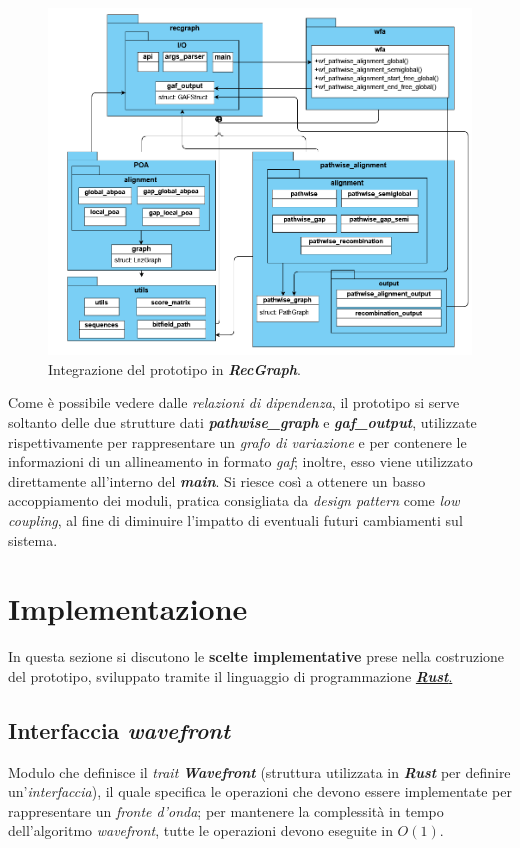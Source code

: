     \begin{figure}[H]
        \centering
        \includegraphics[width=1\linewidth]{images/wf_integration.png} 
        \caption[Integrazione]{Integrazione del prototipo in \textbf{\textit{RecGraph}}.}
        \label{fig:wf_integration}
    \end{figure}
    \vspace{20pt}
    \noindent
    Come è possibile vedere dalle \emph{relazioni di dipendenza}, il prototipo si serve soltanto delle due strutture dati \textbf{\textit{pathwise\_graph}} e \textbf{\textit{gaf\_output}}, utilizzate rispettivamente per rappresentare un \emph{grafo di variazione} e per contenere le informazioni di un allineamento in formato \emph{gaf}; inoltre, esso viene utilizzato direttamente all'interno del \textbf{\textit{main}}. Si riesce così a ottenere un basso accoppiamento dei moduli, pratica consigliata da \emph{design pattern} come \emph{low coupling}, al fine di diminuire l'impatto di eventuali futuri cambiamenti sul sistema.  

\section{Implementazione}
    In questa sezione si discutono le \textbf{scelte implementative} prese nella costruzione del prototipo, sviluppato tramite il linguaggio di programmazione \href{https://www.rust-lang.org/it}{\textbf{\textit{Rust}}.} 

\subsection{Interfaccia \textit{wavefront}}
    Modulo che definisce il \emph{trait} \textbf{\textit{Wavefront}} (struttura utilizzata in \textbf{\textit{Rust}} per definire un'\emph{interfaccia}), il quale specifica le operazioni che devono essere implementate per rappresentare un \emph{fronte d'onda}; per mantenere la complessità in tempo dell'algoritmo \emph{wavefront}, tutte le operazioni devono eseguite in $O(1)$. 
    
